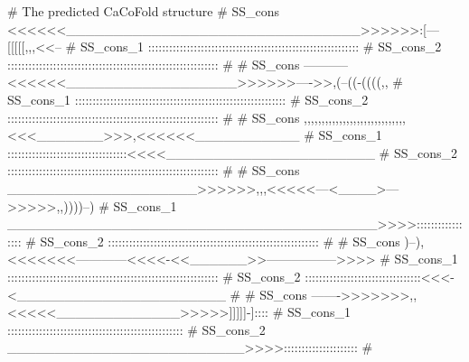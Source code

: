 \begin{sreoutput}
# The predicted CaCoFold structure
# SS_cons   <<<<<<_______________________________>>>>>>:[---[[[[[,,,<<--
# SS_cons_1 ::::::::::::::::::::::::::::::::::::::::::::::::::::::::::::
# SS_cons_2 ::::::::::::::::::::::::::::::::::::::::::::::::::::::::::::
#
# SS_cons   -----------<<<<<<__________________>>>>>>---->>,(--((-((((,,
# SS_cons_1 ::::::::::::::::::::::::::::::::::::::::::::::::::::::::::::
# SS_cons_2 ::::::::::::::::::::::::::::::::::::::::::::::::::::::::::::
#
# SS_cons   ,,,,,,,,,,,,,,,,,,,,,,,,,,,,,<<<_______>>>,<<<<<<___________
# SS_cons_1 ::::::::::::::::::::::::::::::::::<<<<______________________
# SS_cons_2 ::::::::::::::::::::::::::::::::::::::::::::::::::::::::::::
#
# SS_cons   ____________________>>>>>>,,,<<<<<---<____>--->>>>>,,))))--)
# SS_cons_1 _______________________________________>>>>:::::::::::::::::
# SS_cons_2 ::::::::::::::::::::::::::::::::::::::::::::::::::::::::::::
#
# SS_cons   )--),<<<<<<<------------<<<<-<<______>>----------------->>>>
# SS_cons_1 ::::::::::::::::::::::::::::::::::::::::::::::::::::::::::::
# SS_cons_2 :::::::::::::::::::::::::::::::::<<<-<______________________
#
# SS_cons   ------->>>>>>>,,<<<<<_____________>>>>>]]]]]-]::::
# SS_cons_1 ::::::::::::::::::::::::::::::::::::::::::::::::::
# SS_cons_2 _________________________>>>>:::::::::::::::::::::
#


\end{sreoutput}
